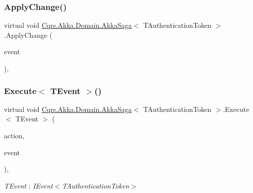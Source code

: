 \subsubsection{\texorpdfstring{Apply\+Change()}{ApplyChange()}\hspace{0.1cm}{\footnotesize\ttfamily [2/2]}}
{\footnotesize\ttfamily virtual void \hyperlink{classCqrs_1_1Akka_1_1Domain_1_1AkkaSaga}{Cqrs.\+Akka.\+Domain.\+Akka\+Saga}$<$ T\+Authentication\+Token $>$.Apply\+Change (\begin{DoxyParamCaption}\item[{\hyperlink{interfaceCqrs_1_1Events_1_1IEvent}{I\+Event}$<$ T\+Authentication\+Token $>$ @}]{event }\end{DoxyParamCaption})\hspace{0.3cm}{\ttfamily [protected]}, {\ttfamily [virtual]}}

\mbox{\label{classCqrs_1_1Akka_1_1Domain_1_1AkkaSaga_ac0782ac0b7e28418a52cead1b7b8b0c3}} 
\subsubsection{\texorpdfstring{Execute$<$ T\+Event $>$()}{Execute< TEvent >()}}
{\footnotesize\ttfamily virtual void \hyperlink{classCqrs_1_1Akka_1_1Domain_1_1AkkaSaga}{Cqrs.\+Akka.\+Domain.\+Akka\+Saga}$<$ T\+Authentication\+Token $>$.Execute$<$ T\+Event $>$ (\begin{DoxyParamCaption}\item[{Action$<$ T\+Event $>$}]{action,  }\item[{T\+Event @}]{event }\end{DoxyParamCaption})\hspace{0.3cm}{\ttfamily [protected]}, {\ttfamily [virtual]}}

\begin{Desc}
\item[Type Constraints]\begin{description}
\item[{\em T\+Event} : {\em I\+Event$<$T\+Authentication\+Token$>$}]\end{description}
\end{Desc}
\mbox{\label{classCqrs_1_1Akka_1_1Domain_1_1AkkaSaga_ac88061e29e3e2223db31ce9075835b46}} 
